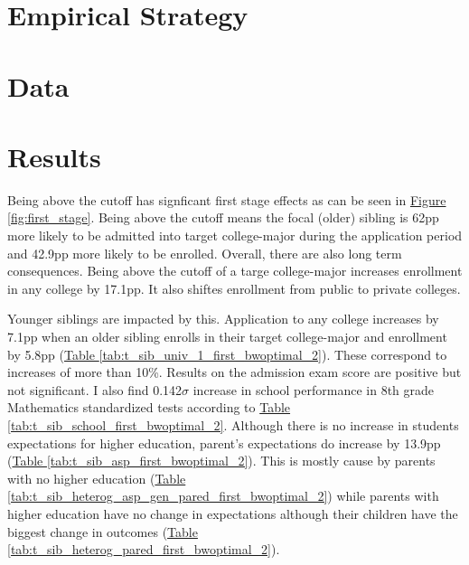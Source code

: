 \section{Empirical Strategy}\label{sec:empirical_strategy}


\section{Data}\label{sec:data}

\section{Results}\label{sec:results}

Being above the cutoff has signficant first stage effects as can be seen in \hyperref[fig:first_stage]{Figure \ref{fig:first_stage}}. Being above the cutoff means the focal (older) sibling is 62pp more likely to be admitted into target college-major during the application period and 42.9pp more likely to be enrolled. Overall, there are also long term consequences. Being above the cutoff of a targe college-major increases enrollment in any college by 17.1pp. It also shiftes enrollment from public to private colleges.

Younger siblings are impacted by this. Application to any college increases by 7.1pp when an older sibling enrolls in their target college-major and enrollment by 5.8pp (\hyperref[tab:t_sib_univ_1_first_bwoptimal_2]{Table \ref{tab:t_sib_univ_1_first_bwoptimal_2}}). These correspond to increases of more than 10\%. Results on the admission exam score are positive but not significant. I also find 0.142$\sigma$ increase in school performance in 8th grade Mathematics standardized tests according to \hyperref[tab:t_sib_school_first_bwoptimal_2]{Table \ref{tab:t_sib_school_first_bwoptimal_2}}. Although there is no increase in students expectations for higher education, parent's expectations do increase by 13.9pp (\hyperref[tab:t_sib_asp_first_bwoptimal_2]{Table \ref{tab:t_sib_asp_first_bwoptimal_2}}). This is mostly cause by parents with no higher education (\hyperref[tab:t_sib_heterog_asp_gen_pared_first_bwoptimal_2]{Table \ref{tab:t_sib_heterog_asp_gen_pared_first_bwoptimal_2}}) while parents with higher education have no change in expectations although their children have the biggest change in outcomes (\hyperref[tab:t_sib_heterog_pared_first_bwoptimal_2]{Table \ref{tab:t_sib_heterog_pared_first_bwoptimal_2}}).












